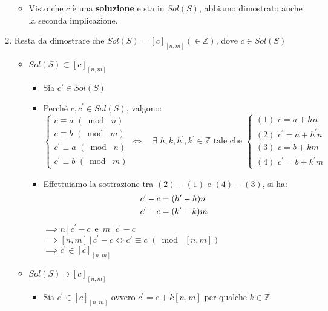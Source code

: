 \documentclass[10pt]{article}
\begin{document}
\begin{enumerate}
\begin{itemize}
\item
Visto che $c$ è una \textbf{soluzione} e sta in $Sol(S)$, abbiamo dimostrato anche la seconda implicazione.
\end{itemize}
\item
Resta da dimostrare che $Sol(S) = \left[c\right]_{\left[n,m\right]} (\in \mathbb{Z})$, dove $c \in Sol(S)$
\begin{itemize}
\item
$Sol(S) \subset \left[c\right]_{\left[n,m\right]}$
\begin{itemize}
\item
Sia $c' \in Sol(S)$
\item
Perchè $c, c^\prime \in Sol(S)$, valgono:
$\begin{cases} c \equiv a \,\, (\bmod \,\,n) \\ c \equiv b \,\, (\bmod \,\, m) \\ c^\prime \equiv a \,\, (\bmod \,\,n) \\ c^\prime \equiv b \,\, (\bmod \,\, m) \end{cases} \Longleftrightarrow \quad \exists \,\, h,k,h^\prime,k^\prime \in \mathbb{Z} \textrm{ tale che } \begin{cases}  (1)\,\,c = a + hn \\ (2)\,\,c^\prime = a + h^\prime n \\ (3)\,\,c = b + km \\ (4)\,\,c^\prime = b + k^\prime m \end{cases}$
\smallskip 
\item
Effettuiamo la sottrazione tra $(2) - (1)$ e $(4) - (3)$, si ha:
\begin{equation}
\begin{split}
c' - c &= (h^\prime - h)n \\
c' - c &= (k^\prime - k)m
\notag
\end{split}
\end{equation}
$\!\!\implies n\,|\, c^\prime  - c\,$ e $\,m\,|\, c^\prime - c$ \\ 
$\implies \left[n,m\right] \,|\, c^\prime - c \Longleftrightarrow c ' \equiv c \,\, (\bmod \,\, \left[n,m\right])$ \\
$\implies c^\prime \in \left[c\right]_{\left[n,m\right]}$
\smallskip
\end{itemize}
\item
$Sol(S) \supset \left[c\right]_{\left[n,m\right]}$
\begin{itemize}
\item
Sia $c^\prime \in \left[c\right]_{\left[n,m\right]}$ ovvero $c^\prime = c + k\left[n,m\right]$ per qualche $k \in \mathbb{Z}$

\end{itemize}
\end{itemize}
\end{enumerate}
\end{document}

